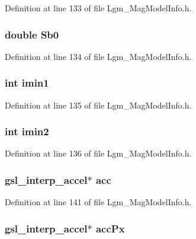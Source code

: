 Definition at line 133 of file Lgm\_\-MagModelInfo.h.\hypertarget{struct_lgm___mag_model_info_42a3a606a80dbe9a94436854fdef0516}{
\subsubsection[{Sb0}]{\setlength{\rightskip}{0pt plus 5cm}double {\bf Sb0}}}
\label{struct_lgm___mag_model_info_42a3a606a80dbe9a94436854fdef0516}




Definition at line 134 of file Lgm\_\-MagModelInfo.h.\hypertarget{struct_lgm___mag_model_info_7398fdf92dfab0dfd2d5ac11eaa570bc}{
\subsubsection[{imin1}]{\setlength{\rightskip}{0pt plus 5cm}int {\bf imin1}}}
\label{struct_lgm___mag_model_info_7398fdf92dfab0dfd2d5ac11eaa570bc}




Definition at line 135 of file Lgm\_\-MagModelInfo.h.\hypertarget{struct_lgm___mag_model_info_b38a4f405262c1ee308e925285be06c2}{
\subsubsection[{imin2}]{\setlength{\rightskip}{0pt plus 5cm}int {\bf imin2}}}
\label{struct_lgm___mag_model_info_b38a4f405262c1ee308e925285be06c2}




Definition at line 136 of file Lgm\_\-MagModelInfo.h.\hypertarget{struct_lgm___mag_model_info_7c9a9e6523a7a6e67a5b349e772e3765}{
\subsubsection[{acc}]{\setlength{\rightskip}{0pt plus 5cm}gsl\_\-interp\_\-accel$\ast$ {\bf acc}}}
\label{struct_lgm___mag_model_info_7c9a9e6523a7a6e67a5b349e772e3765}




Definition at line 141 of file Lgm\_\-MagModelInfo.h.\hypertarget{struct_lgm___mag_model_info_b695ec5d60e2b6c19e995ada21303a66}{
\subsubsection[{accPx}]{\setlength{\rightskip}{0pt plus 5cm}gsl\_\-interp\_\-accel$\ast$ {\bf accPx}}}
\label{struct_lgm___mag_model_info_b695ec5d60e2b6c19e995ada21303a66}




